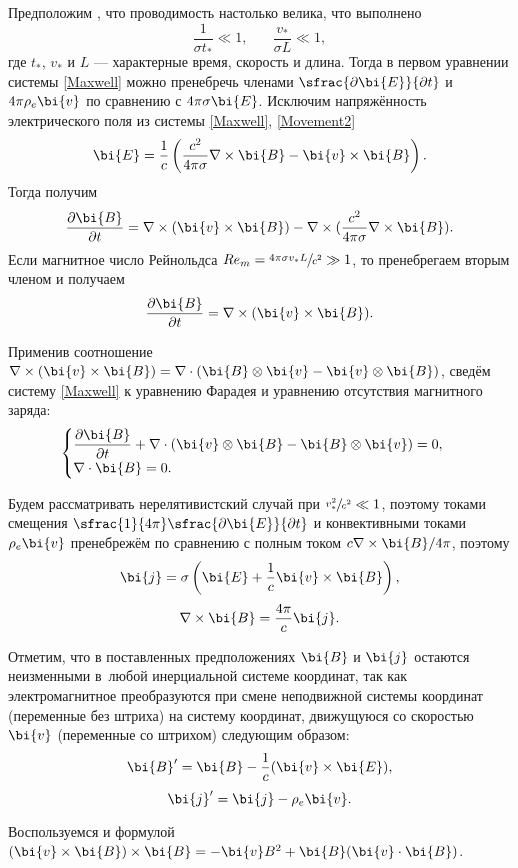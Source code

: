 \documentclass[12pt, a4paper]{article}
\begin{document}
	Предположим \cite{Kulikovskiy}, что проводимость настолько велика, что выполнено
	\[
	\dfrac{1}{\sigma t_*} \ll 1, \phantom{xxx} \dfrac{v_*}{\sigma L} \ll 1,
	\]
	где $t_*$, $v_*$ и $L$ --- характерные время, скорость и длина. Тогда в первом уравнении системы \eqref{Maxwell} можно пренебречь членами $\sfrac{\partial \bi{E}}{\partial t}$ и $4\pi\rho_e\bi{v}$ по сравнению с $4\pi\sigma\bi{E}$. Исключим напряжённость электрического поля из системы \eqref{Maxwell}, \eqref{Movement2}
	\[
	\bi{E} = \dfrac1c \left(\dfrac{c^2}{4\pi\sigma}\nabla\times\bi{B} - \bi{v}\times\bi{B}\right).
	\]
	Тогда получим 
	\[
	\dfrac{\partial \bi{B}}{\partial t} = \nabla \times (\bi{v}\times\bi{B}) - \nabla \times (\dfrac{c^2}{4\pi\sigma} \nabla \times \bi{B}).
	\]
	Если магнитное число Рейнольдса $Re_m = \sfrac{4\pi\sigma v_* L}{c^2} \gg 1$, то пренебрегаем вторым членом и получаем
	\[
		\dfrac{\partial \bi{B}}{\partial t} = \nabla \times (\bi{v}\times\bi{B}).
	\]
	
	Применив соотношение $\nabla \times ( \bi{v}\times\bi{B} ) = \nabla\cdot(\bi{B}\otimes\bi{v}-\bi{v}\otimes\bi{B})$, сведём систему \eqref{Maxwell} к уравнению Фарадея и уравнению отсутствия магнитного заряда:
	\[
	\begin{cases}
		\dfrac{\partial \bi{B}}{\partial t} + \nabla \cdot (\bi{v}\otimes\bi{B}-\bi{B}\otimes\bi{v}) = 0, \\
		\nabla\cdot\bi{B} = 0.
	\end{cases}
	\]
	
	Будем рассматривать нерелятивистский случай при $\sfrac{v_*^2}{c^2}\ll1$, поэтому токами смещения $\sfrac{1}{4\pi}\sfrac{\partial\bi{E}}{\partial t}$ и конвективными токами $\rho_e \bi{v}$ пренебрежём по сравнению с полным током $c\nabla\times\bi{B}/4\pi$, поэтому
	\[
	\bi{j} = \sigma \left(\bi{E}+ \dfrac1c \bi{v}\times \bi{B}\right),
	\]
	\[
	\nabla\times\bi{B} = \dfrac{4\pi}{c}\bi{j}.
	\]
	
	Отметим, что в поставленных предположениях $\bi{B}$ и $\bi{j}$ остаются неизменными в~любой инерциальной системе координат, так как электромагнитное преобразуются при смене неподвижной системы координат (переменные без штриха) на систему координат, движущуюся со скоростью $\bi{v}$ (переменные со штрихом) следующим образом:
	\[
		\bi{B}' = \bi{B}-\dfrac{1}{c}(\bi{v}\times\bi{E}),
	\]
	\[
	\bi{j}' = \bi{j} - \rho_e \bi{v}.
	\]
	
	Воспользуемся и формулой $(\bi{v}\times\bi{B})\times\bi{B} = -\bi{v}B^2 + \bi{B}(\bi{v}\cdot\bi{B})$.
	\pagebreak
	
\end{document}
